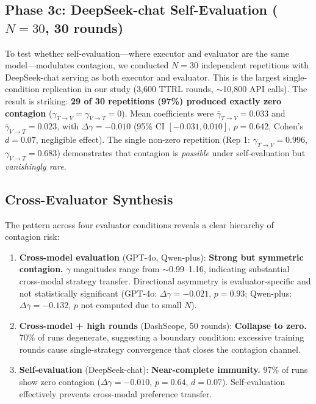 \documentclass[11pt,a4paper]{article}
\begin{document}
\subsection{Phase 3c: DeepSeek-chat Self-Evaluation ($N=30$, 30 rounds)}

To test whether self-evaluation---where executor and evaluator are the same model---modulates contagion, we conducted $N=30$ independent repetitions with DeepSeek-chat serving as both executor and evaluator. This is the largest single-condition replication in our study (3,600 TTRL rounds, $\sim$10,800 API calls). The result is striking: \textbf{29 of 30 repetitions (97\%) produced exactly zero contagion} ($\gamma_{T\to V} = \gamma_{V\to T} = 0$). Mean coefficients were $\bar{\gamma}_{T\to V}=0.033$ and $\bar{\gamma}_{V\to T}=0.023$, with $\Delta\gamma=-0.010$ (95\% CI $[-0.031, 0.010]$, $p=0.642$, Cohen's $d=0.07$, negligible effect). The single non-zero repetition (Rep 1: $\gamma_{T\to V}=0.996$, $\gamma_{V\to T}=0.683$) demonstrates that contagion is \textit{possible} under self-evaluation but \textit{vanishingly rare}.

\subsection{Cross-Evaluator Synthesis}

The pattern across four evaluator conditions reveals a clear hierarchy of contagion risk:

\begin{enumerate}[leftmargin=*]
    \item \textbf{Cross-model evaluation} (GPT-4o, Qwen-plus): \textbf{Strong but symmetric contagion.} $\gamma$ magnitudes range from $\sim$0.99--1.16, indicating substantial cross-modal strategy transfer. Directional asymmetry is evaluator-specific and not statistically significant (GPT-4o: $\Delta\gamma=-0.021$, $p=0.93$; Qwen-plus: $\Delta\gamma=-0.132$, $p$ not computed due to small $N$).
    \item \textbf{Cross-model + high rounds} (DashScope, 50 rounds): \textbf{Collapse to zero.} 70\% of runs degenerate, suggesting a boundary condition: excessive training rounds cause single-strategy convergence that closes the contagion channel.
    \item \textbf{Self-evaluation} (DeepSeek-chat): \textbf{Near-complete immunity.} 97\% of runs show zero contagion ($\Delta\gamma=-0.010$, $p=0.64$, $d=0.07$). Self-evaluation effectively prevents cross-modal preference transfer.
\end{enumerate}
\end{document}
